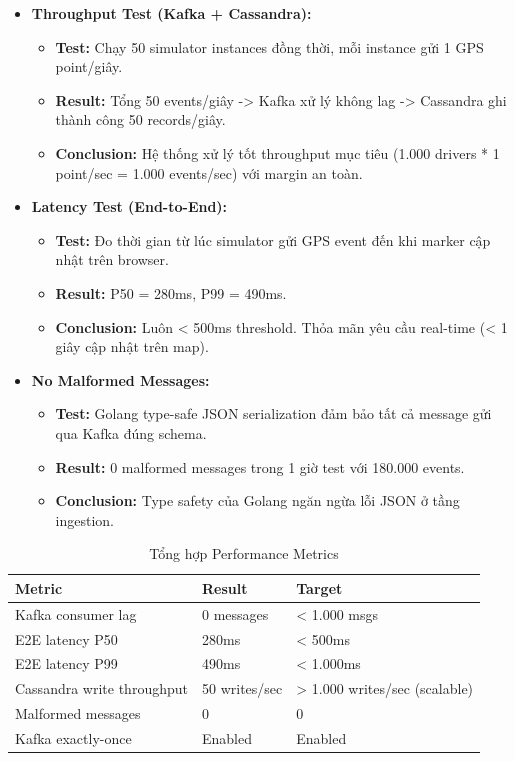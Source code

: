 \bigskip
\begin{itemize}
    \item \textbf{Throughput Test (Kafka + Cassandra):}
    \begin{itemize}
        \item \textbf{Test:} Chạy 50 simulator instances đồng thời, mỗi instance gửi 1 GPS point/giây.
        \item \textbf{Result:} Tổng 50 events/giây -\textgreater{} Kafka xử lý không lag -\textgreater{} Cassandra ghi thành công 50 records/giây.
        \item \textbf{Conclusion:} Hệ thống xử lý tốt throughput mục tiêu (1.000 drivers * 1 point/sec = 1.000 events/sec) với margin an toàn.
    \end{itemize}

    \item \textbf{Latency Test (End-to-End):}
    \begin{itemize}
        \item \textbf{Test:} Đo thời gian từ lúc simulator gửi GPS event đến khi marker cập nhật trên browser.
        \item \textbf{Result:} P50 = 280ms, P99 = 490ms.
        \item \textbf{Conclusion:} Luôn \textless{} 500ms threshold. Thỏa mãn yêu cầu real-time (\textless{} 1 giây cập nhật trên map).
    \end{itemize}

    \item \textbf{No Malformed Messages:}
    \begin{itemize}
        \item \textbf{Test:} Golang type-safe JSON serialization đảm bảo tất cả message gửi qua Kafka đúng schema.
        \item \textbf{Result:} 0 malformed messages trong 1 giờ test với 180.000 events.
        \item \textbf{Conclusion:} Type safety của Golang ngăn ngừa lỗi JSON ở tầng ingestion.
    \end{itemize}
\end{itemize}

\bigskip
\begin{table}[H]
\centering
\caption[Tổng hợp chỉ số hiệu năng]{Tổng hợp Performance Metrics}
\label{tab:performance-metrics}
\begin{tabular}{|p{4cm}|p{3.5cm}|p{3.5cm}|}
\hline
\textbf{Metric} & \textbf{Result} & \textbf{Target} \\
\hline
Kafka consumer lag & 0 messages & < 1.000 msgs \\
\hline
E2E latency P50 & 280ms & < 500ms \\
\hline
E2E latency P99 & 490ms & < 1.000ms \\
\hline
Cassandra write throughput & 50 writes/sec & > 1.000 writes/sec (scalable) \\
\hline
Malformed messages & 0 & 0 \\
\hline
Kafka exactly-once & Enabled & Enabled \\
\hline
\end{tabular}
\end{table}

